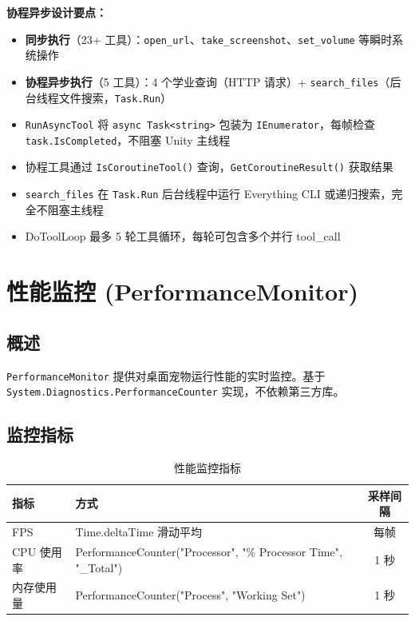 \documentclass[12pt,a4paper]{ctexart}
\begin{document}
\textbf{协程异步设计要点：}
\begin{itemize}
    \item \textbf{同步执行}（23+ 工具）：\texttt{open\_url}、\texttt{take\_screenshot}、\texttt{set\_volume} 等瞬时系统操作
    \item \textbf{协程异步执行}（5 工具）：4 个学业查询（HTTP 请求）+ \texttt{search\_files}（后台线程文件搜索，\texttt{Task.Run}）
    \item \texttt{RunAsyncTool} 将 \texttt{async Task<string>} 包装为 \texttt{IEnumerator}，每帧检查 \texttt{task.IsCompleted}，不阻塞 Unity 主线程
    \item 协程工具通过 \texttt{IsCoroutineTool()} 查询，\texttt{GetCoroutineResult()} 获取结果
    \item \texttt{search\_files} 在 \texttt{Task.Run} 后台线程中运行 Everything CLI 或递归搜索，完全不阻塞主线程
    \item DoToolLoop 最多 5 轮工具循环，每轮可包含多个并行 tool\_call
\end{itemize}

\section{性能监控 (PerformanceMonitor)}

\subsection{概述}

\texttt{PerformanceMonitor} 提供对桌面宠物运行性能的实时监控。基于 \texttt{System.Diagnostics.PerformanceCounter} 实现，不依赖第三方库。

\subsection{监控指标}

\begin{table}[H]
\centering
\caption{性能监控指标}
\label{tab:perf-metrics}
\begin{tabular}{llc}
\toprule
\textbf{指标} & \textbf{方式} & \textbf{采样间隔} \\
\midrule
FPS & Time.deltaTime 滑动平均 & 每帧 \\
CPU 使用率 & PerformanceCounter("Processor", "\% Processor Time", "\_Total") & 1 秒 \\
内存使用量 & PerformanceCounter("Process", "Working Set") & 1 秒 \\
\bottomrule
\end{tabular}
\end{table}
\end{document}
